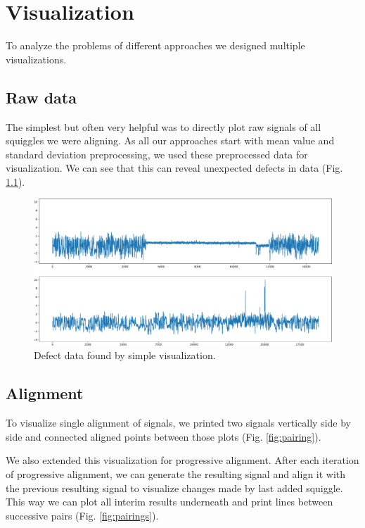\chapter{Visualization}

\label{kap:visualization} %

To analyze the problems of different approaches we designed multiple visualizations.

\section{Raw data}

The simplest but often very helpful was to directly plot raw signals of all squiggles we were aligning. As all our approaches start with mean value and standard deviation preprocessing, 
we used these preprocessed data for visualization. We can see that this can reveal unexpected defects in data (Fig. \ref{fig:signals}). 

\begin{figure}[h]
  \centering
  \includegraphics[width=1.0\textwidth]{images/signals}
  \caption{Defect data found by simple visualization.}
  \label{fig:signals}
\end{figure}

\section{Alignment}
To visualize single alignment of signals, we printed two signals vertically side by side and connected
aligned points between those plots (Fig. \ref{fig:pairing}). 

We also extended this visualization for progressive alignment. 
After each iteration of progressive alignment, we can generate the resulting signal and align it with the previous resulting signal to visualize
changes made by last added squiggle. This way we can plot all interim results underneath and print lines between successive pairs (Fig. \ref{fig:pairings}).

